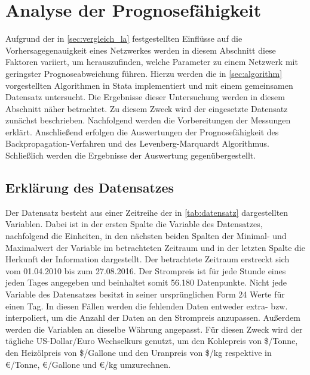 

\section{Analyse der Prognosefähigkeit}\label{sec:analyse}

Aufgrund der in \autoref{sec:vergleich_la} festgestellten Einflüsse auf die Vorhersagegenauigkeit eines Netzwerkes werden in diesem Abschnitt diese Faktoren variiert, um herauszufinden, welche Parameter zu einem Netzwerk mit geringster Prognoseabweichung führen. Hierzu werden die in \autoref{sec:algorithm} vorgestellten Algorithmen in Stata implementiert und mit einem gemeinsamen Datensatz untersucht. Die Ergebnisse dieser Untersuchung werden in diesem Abschnitt näher betrachtet. Zu diesem Zweck wird der eingesetzte Datensatz zunächst beschrieben. Nachfolgend werden die Vorbereitungen der Messungen erklärt. Anschließend erfolgen die Auswertungen der Prognosefähigkeit des Backpropagation-Verfahren und des Levenberg-Marquardt Algorithmus. Schließlich werden die Ergebnisse der Auswertung gegenübergestellt.



\subsection{Erklärung des Datensatzes}\label{sec:datensatz}

Der Datensatz besteht aus einer Zeitreihe der in \autoref{tab:datensatz} dargestellten Variablen. Dabei ist in der ersten Spalte die Variable des Datensatzes, nachfolgend die Einheiten, in den nächsten beiden Spalten der Minimal- und Maximalwert der Variable im betrachteten Zeitraum und in der letzten Spalte die Herkunft der Information dargestellt. Der betrachtete Zeitraum erstreckt sich vom 01.04.2010 bis zum 27.08.2016. Der Strompreis ist für jede Stunde eines jeden Tages angegeben und beinhaltet somit 56.180 Datenpunkte. Nicht jede Variable des Datensatzes besitzt in seiner ursprünglichen Form 24 Werte für einen Tag. In diesen Fällen werden die fehlenden Daten entweder extra- bzw. interpoliert, um die Anzahl der Daten an den Strompreis anzupassen. Außerdem werden die Variablen an dieselbe Währung angepasst. Für diesen Zweck wird der tägliche US-Dollar/Euro Wechselkurs genutzt, um den Kohlepreis von \$/Tonne, den Heizölpreis von \$/Gallone und den Uranpreis von \$/kg respektive in €/Tonne, €/Gallone und €/kg umzurechnen.

